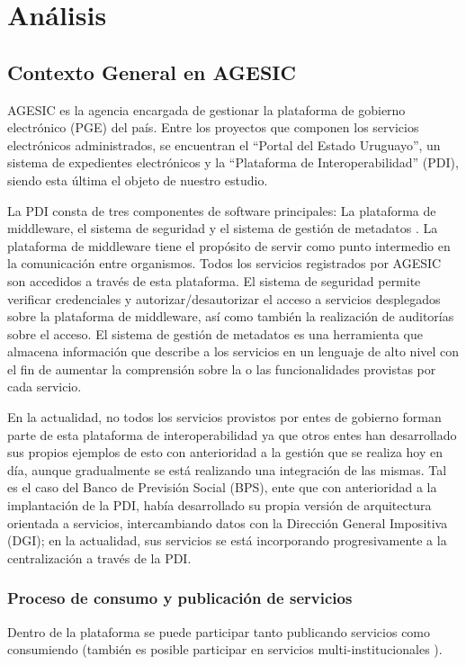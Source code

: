 \chapter{Análisis}
\label{Analisis}

\section{Contexto General en AGESIC}
\label{Analisis:ContextoAgesic}
AGESIC es la agencia encargada de gestionar la plataforma de gobierno electrónico (PGE) del país. Entre los proyectos que componen los servicios electrónicos administrados, se encuentran el “Portal del Estado Uruguayo”, un sistema de expedientes electrónicos y la “Plataforma de Interoperabilidad” (PDI), siendo esta última el objeto de nuestro estudio.

La PDI consta de tres componentes de software principales: La plataforma de middleware, el sistema de seguridad y el sistema de gestión de metadatos \cite{Agesic:GuiaUsos}. La plataforma de middleware tiene el propósito de servir como punto intermedio en la comunicación entre organismos. Todos los servicios registrados por AGESIC son accedidos a través de esta plataforma. El sistema de seguridad permite verificar credenciales y autorizar/desautorizar el acceso a servicios desplegados sobre la plataforma de middleware, así como también la realización de auditorías sobre el acceso. El sistema de gestión de metadatos es una herramienta que almacena información que describe a los servicios en un lenguaje de alto nivel con el fin de aumentar la comprensión sobre la o las funcionalidades provistas por cada servicio.

En la actualidad, no todos los servicios provistos por entes de gobierno forman parte de esta plataforma de interoperabilidad ya que otros entes han desarrollado sus propios ejemplos de esto con anterioridad a la gestión que se realiza hoy en día, aunque gradualmente se está realizando una integración de las mismas. Tal es el caso del Banco de Previsión Social (BPS), ente que con anterioridad a la implantación de la PDI, había desarrollado su propia versión de arquitectura orientada a servicios, intercambiando datos con la Dirección General Impositiva (DGI); en la actualidad, sus servicios se está incorporando progresivamente a la centralización a través de la PDI.
\subsection{Proceso de consumo y publicación de servicios}
\label{Analisis:ProcesoConsumoPublicacion}
Dentro de la plataforma se puede participar tanto publicando servicios como consumiendo (también es posible participar en servicios multi-institucionales \cite{Agesic:GuiaUsos}).

